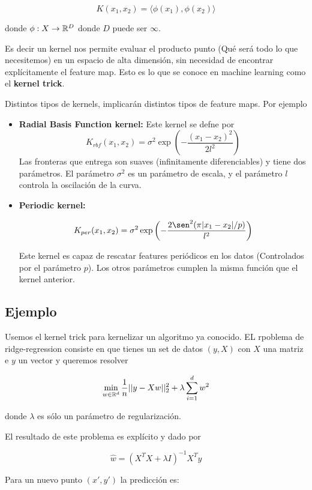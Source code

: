 $$K(x_1, x_2) = \langle \phi(x_1) , \phi(x_2) \rangle$$

donde $\phi: X \to {\mathbb R}^D$ donde $D$ puede ser $\infty$.

Es decir un kernel nos permite evaluar el producto punto (Qué será todo lo que necesitemos) en un espacio de alta dimensión, sin necesidad de encontrar explícitamente el feature map. Esto es lo que se conoce en machine learning como el \textbf{kernel trick}.

Distintos tipos de kernels, implicarán distintos tipos de feature maps. Por ejemplo 
\begin{itemize}
    \item \textbf{Radial Basis Function kernel:} Este kernel se defne por
    $$K_{rbf} (x_1 , x_2 ) = \sigma^2 \exp\left(-\frac{(x_1 -x_2)^2}{2l^2}\right)$$
    Las fronteras que entrega son suaves (infinitamente diferenciables) y tiene dos parámetros. El parámetro $\sigma^2$ es un parámetro de escala, y el parámetro $l$ controla la oscilación de la curva. 
    
    \item \textbf{Periodic kernel:}
    
    $$K_{per} (x_1 , x_2) = \sigma^2 \exp\left(- \frac{2\sen^2 (\pi|x_1 -x_2|/p)}{l^2}\right)$$
    
    Este kernel es capaz de rescatar features periódicos en los datos (Controlados por el parámetro $p$). Los otros parámetros cumplen la misma función que el kernel anterior. 
    
\end{itemize}

\subsection{Ejemplo}

Usemos el kernel trick para kernelizar un algoritmo ya conocido. EL rpoblema de ridge-regression consiste en que tienes un set de datos $(y,X)$ con $X$ una matriz e $y$ un vector y queremos resolver

$$\min_{w \in {\mathbb R}^d} \frac{1}{n}||y - Xw||^{2}_{2} + \lambda \sum\limits_{i=1}^{d} w^2$$

donde $\lambda$ es sólo un parámetro de regularización.

El resultado de este problema es explícito y dado por

$$\hat{w} = (X^T X + \lambda I)^{-1} X^T y$$

Para un nuevo punto $(x', y')$ la predicción es: 

